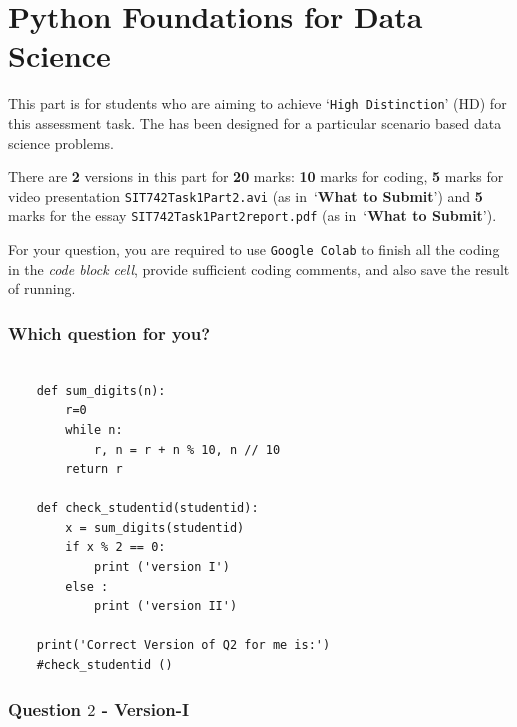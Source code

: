 \documentclass[a4paper]{article}
\begin{document}
    \part{Python Foundations for Data Science}\label{sec:part2}

    This part is for students who are aiming to 
    achieve `\texttt{High Distinction}' (HD) for this assessment task. The  has been designed for a particular scenario based data science problems.

    There are \textbf{2} versions in this part for \textbf{20} marks:
    \textbf{10} marks for coding, \textbf{5} marks for video presentation \texttt{SIT742Task1Part2.avi} 
    (as in~`\textbf{What to Submit}')
    and \textbf{5} marks for the essay \texttt{SIT742Task1Part2report.pdf} (as in~`\textbf{What to Submit}'). 
  
    
    For your question,
    you are required to use \texttt{Google Colab} 
    to finish all the coding in the \textit{code block cell}, 
    provide sufficient coding comments, 
    and also save the result of running.   
    
    \section{Which question for you?}\label{sec-which}

    \begin{lstlisting}

    def sum_digits(n):
        r=0
        while n:
            r, n = r + n % 10, n // 10
        return r

    def check_studentid(studentid):
        x = sum_digits(studentid)
        if x % 2 == 0:
            print ('version I')
        else :
            print ('version II')

    print('Correct Version of Q2 for me is:')
    #check_studentid ()
    \end{lstlisting}

    \section{Question $2$ - Version-I}
    
\end{document}

